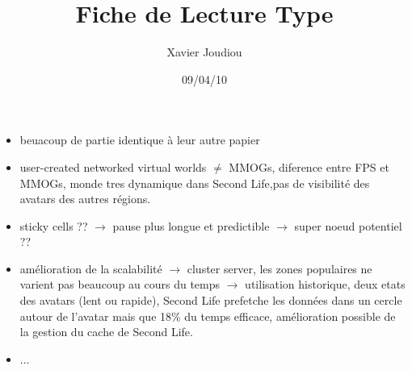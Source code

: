 \documentclass[11pt,a4paper]{article}
\title{Fiche de Lecture Type}
\author{Xavier Joudiou}
\date{09/04/10}
\begin{document}
	
  \begin{itemize}
  \renewcommand{\labelitemi}{$\Rightarrow$}
	\item beuacoup de partie identique à leur autre papier
	\item user-created networked virtual worlds $\ne$ MMOGs, diference entre FPS et MMOGs, monde tres dynamique dans Second Life,pas de visibilité des avatars des autres régions.
	\item sticky cells ?? $\rightarrow$ pause plus longue et predictible $\rightarrow$ super noeud potentiel ??
	\item amélioration de la scalabilité $\rightarrow$ cluster server, les zones populaires ne varient pas beaucoup au cours du temps $\rightarrow$ utilisation historique, deux etats des avatars (lent ou rapide), Second Life prefetche les données dans un cercle autour de l'avatar mais que 18\% du temps efficace, amélioration possible de la gestion du cache de Second Life.
	\item ...
  \end{itemize}
\end{document}
